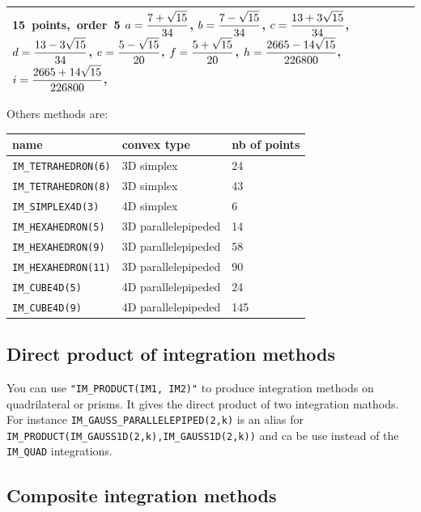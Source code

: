 \documentclass[10pt,a4paper]{article}
\begin{document}
\begin{tabular}{|m{2.5cm}|m{5.5cm}|m{1.2cm}|m{7.01cm}|}
    \mbox{15 points, order 5} \hspace{7em}
    \mbox{$a = {\displaystyle \frac{\displaystyle 7 + \sqrt{15}}{\displaystyle 34}}$,}
    \mbox{$b = {\displaystyle \frac{\displaystyle 7 - \sqrt{15}}{\displaystyle 34}}$,}\hspace{5em}
    \mbox{$c = {\displaystyle \frac{\displaystyle 13 + 3\sqrt{15}}{\displaystyle 34}}$,}
    \mbox{$d = {\displaystyle \frac{\displaystyle 13 - 3\sqrt{15}}{\displaystyle 34}}$,}\hspace{5em}
    \mbox{$e = {\displaystyle \frac{\displaystyle 5 - \sqrt{15}}{\displaystyle 20}}$,}
    \mbox{$f = {\displaystyle \frac{\displaystyle 5 + \sqrt{15}}{\displaystyle 20}}$,}\hspace{5em}
    \mbox{$h = {\displaystyle \frac{\displaystyle 2665 - 14\sqrt{15}}{\displaystyle 226800}}$,}\hspace{5em} 
    \mbox{$i = {\displaystyle \frac{\displaystyle 2665 + 14\sqrt{15}}{\displaystyle 226800}}$,}\hspace{5em} 
  \\ \hline
\end{tabular}

Others methods are:
\begin{center}
  \begin{tabular}{|lll|}
    \hline name & convex type & nb of points\\
    \hline \texttt{IM\_TETRAHEDRON(6)} & 3D simplex & 24\\
    \texttt{IM\_TETRAHEDRON(8)} & 3D simplex & 43\\
    \texttt{IM\_SIMPLEX4D(3)}   & 4D simplex & 6\\
    \texttt{IM\_HEXAHEDRON(5)}  & 3D parallelepipeded & 14\\
    \texttt{IM\_HEXAHEDRON(9)}  & 3D parallelepipeded & 58\\
    \texttt{IM\_HEXAHEDRON(11)}  & 3D parallelepipeded & 90\\
    \texttt{IM\_CUBE4D(5)}      & 4D parallelepipeded & 24\\
    \texttt{IM\_CUBE4D(9)}      & 4D parallelepipeded & 145\\
    \hline
  \end{tabular}
\end{center}
\subsection{Direct product of integration methods}
You can use {\tt "IM\_PRODUCT(IM1, IM2)"} to produce integration methods on quadrilateral or prisms. It gives the direct product of two integration mathods. For instance \texttt{IM\_GAUSS\_PARALLELEPIPED(2,k)} is an alias for \texttt{IM\_PRODUCT(IM\_GAUSS1D(2,k),IM\_GAUSS1D(2,k))} and ca be use instead of the \texttt{IM\_QUAD} integrations.

\subsection{Composite integration methods}
\end{document}
